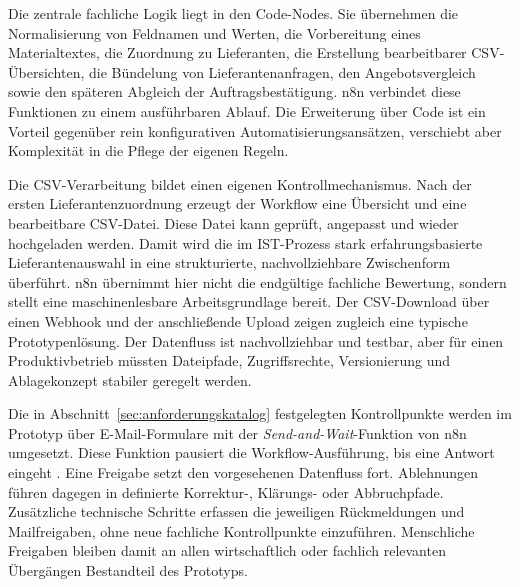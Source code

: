 \documentclass[a4paper,12pt]{article}
\begin{document}
Die zentrale fachliche Logik liegt in den Code-Nodes. Sie übernehmen die Normalisierung von Feldnamen und Werten, die Vorbereitung eines Materialtextes, die Zuordnung zu Lieferanten, die Erstellung bearbeitbarer CSV-Übersichten, die Bündelung von Lieferantenanfragen, den Angebotsvergleich sowie den späteren Abgleich der Auftragsbestätigung. n8n verbindet diese Funktionen zu einem ausführbaren Ablauf. Die Erweiterung über Code ist ein Vorteil gegenüber rein konfigurativen Automatisierungsansätzen, verschiebt aber Komplexität in die Pflege der eigenen Regeln.

Die CSV-Verarbeitung bildet einen eigenen Kontrollmechanismus. Nach der ersten Lieferantenzuordnung erzeugt der Workflow eine Übersicht und eine bearbeitbare CSV-Datei. Diese Datei kann geprüft, angepasst und wieder hochgeladen werden. Damit wird die im IST-Prozess stark erfahrungsbasierte Lieferantenauswahl in eine strukturierte, nachvollziehbare Zwischenform überführt. n8n übernimmt hier nicht die endgültige fachliche Bewertung, sondern stellt eine maschinenlesbare Arbeitsgrundlage bereit. Der CSV-Download über einen Webhook und der anschließende Upload zeigen zugleich eine typische Prototypenlösung. Der Datenfluss ist nachvollziehbar und testbar, aber für einen Produktivbetrieb müssten Dateipfade, Zugriffsrechte, Versionierung und Ablagekonzept stabiler geregelt werden.

Die in Abschnitt~\ref{sec:anforderungskatalog} festgelegten Kontrollpunkte werden im Prototyp über E-Mail-Formulare mit der \textit{Send-and-Wait}-Funktion von n8n umgesetzt. Diese Funktion pausiert die Workflow-Ausführung, bis eine Antwort eingeht \parencite{n8n_docs_2026}. Eine Freigabe setzt den vorgesehenen Datenfluss fort. Ablehnungen führen dagegen in definierte Korrektur-, Klärungs- oder Abbruchpfade. Zusätzliche technische Schritte erfassen die jeweiligen Rückmeldungen und Mailfreigaben, ohne neue fachliche Kontrollpunkte einzuführen. Menschliche Freigaben bleiben damit an allen wirtschaftlich oder fachlich relevanten Übergängen Bestandteil des Prototyps.
\end{document}
